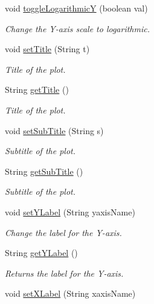 \begin{DoxyCompactItemize}
void \hyperlink{classbridges_1_1base_1_1_line_chart_a7946f217a7b3567ee1a1bd8266ed43ca}{toggle\+LogarithmicY} (boolean val)
\begin{DoxyCompactList}\small\item\em Change the Y-\/axis scale to logarithmic. \end{DoxyCompactList}\item 
void \hyperlink{classbridges_1_1base_1_1_line_chart_a893519da804666988c49b918c87da2a2}{set\+Title} (String t)
\begin{DoxyCompactList}\small\item\em Title of the plot. \end{DoxyCompactList}\item 
String \hyperlink{classbridges_1_1base_1_1_line_chart_aedc5f75b158298b755ba0c31bcf84138}{get\+Title} ()
\begin{DoxyCompactList}\small\item\em Title of the plot. \end{DoxyCompactList}\item 
void \hyperlink{classbridges_1_1base_1_1_line_chart_ad24bfdd49194f8e152fdb80e039762ad}{set\+Sub\+Title} (String s)
\begin{DoxyCompactList}\small\item\em Subtitle of the plot. \end{DoxyCompactList}\item 
String \hyperlink{classbridges_1_1base_1_1_line_chart_a102006e90f2a226886538db0eeda6b08}{get\+Sub\+Title} ()
\begin{DoxyCompactList}\small\item\em Subtitle of the plot. \end{DoxyCompactList}\item 
void \hyperlink{classbridges_1_1base_1_1_line_chart_adddccbe77ebd2590f426fab9c8227457}{set\+Y\+Label} (String yaxis\+Name)
\begin{DoxyCompactList}\small\item\em Change the label for the Y-\/axis. \end{DoxyCompactList}\item 
String \hyperlink{classbridges_1_1base_1_1_line_chart_ad3ae17da720b1f89406ab742379ddfd6}{get\+Y\+Label} ()
\begin{DoxyCompactList}\small\item\em Returns the label for the Y-\/axis. \end{DoxyCompactList}\item 
void \hyperlink{classbridges_1_1base_1_1_line_chart_ab402a1134bb79919860368a234f62ea2}{set\+X\+Label} (String xaxis\+Name)

\end{DoxyCompactItemize}

